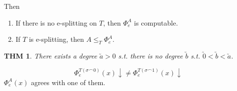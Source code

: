 \documentclass[12pt]{article}
\begin{document}
Then
\begin{enumerate}
  \item If there is no e-splitting on $T$,
    then $\Phi^A_e$ is computable.
  \item If $T$ is e-splitting, then $A \le_T \Phi^A_e$. 
\end{enumerate}

\newtheorem*{existsdeg}{THM}
\begin{existsdeg}
  There exists a degree $\utilde{a} > 0$ s.t. 
  there is no degree $\utilde{b}$ s.t. $\utilde{0} < \utilde{b} < \utilde{a}$.
\end{existsdeg}

\[
\Phi_e^{T(\sigma\frown 0)}(x)\downarrow \ne 
\Phi_e^{T(\sigma\frown 1)}(x)\downarrow
\]
\newcommand{\gn}[1]{\ulcorner #1 \urcorner}
$\Phi_e^{A}(x)$ agrees with one of them.
\end{document}
